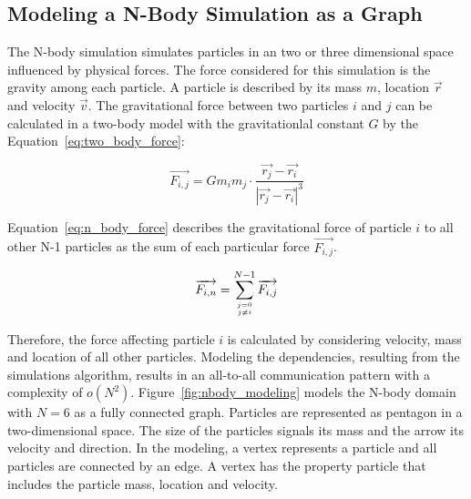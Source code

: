 \subsection{Modeling a N-Body Simulation as a Graph}
\label{sec:design:nbody}


The N-body simulation simulates particles in an two or three
dimensional space influenced by physical forces. The force considered
for this simulation is the gravity among each particle.  A particle is
described by its mass $m$, location $\overrightarrow{r}$ and velocity
$\overrightarrow{v}$.  The gravitational force between two particles
$i$ and $j$ can be calculated in a two-body model with the
gravitationlal constant $G$ by the Equation~\ref{eq:two_body_force}:

\begin{equation}
  \label{eq:two_body_force}
  \overrightarrow{F_{i,j}} = G  m_i  m_j \cdot \frac{\overrightarrow{r_j} - \overrightarrow{r_i}}{|\overrightarrow{r_j} - \overrightarrow{r_i}|^3}
\end{equation}

\noindent Equation~\ref{eq:n_body_force} describes the gravitational force of
particle $i$ to all other N-1 particles as the sum of each particular
force $\overrightarrow{F_{i,j}}$.

\begin{equation}
  \label{eq:n_body_force}
  \overrightarrow{F_{i,n}} = \sum_{j = 0 \atop j \neq i}^{N-1} \overrightarrow{F_{i,j}}
\end{equation}

\noindent Therefore, the force affecting particle $i$ is calculated by
considering velocity, mass and location of all other
particles. Modeling the dependencies, resulting from the simulations
algorithm, results in an all-to-all communication pattern with a
complexity of $o(N^2)$. Figure~\ref{fig:nbody_modeling} models the
N-body domain with $N = 6$ as a fully connected graph. Particles are
represented as pentagon in a two-dimensional space. The size of the
particles signals its mass and the arrow its velocity and direction.
In the modeling, a vertex represents a particle and all particles are
connected by an edge. A vertex has the property particle that includes
the particle mass, location and velocity.

